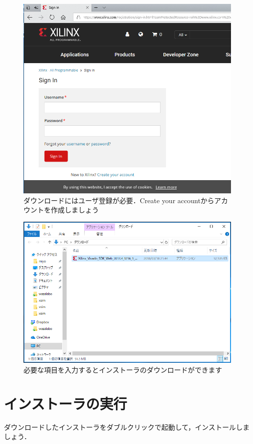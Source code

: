 \documentclass[a4paper,dvipdfmx]{jsarticle}
\begin{document}
 \begin{figure}[H]
  \begin{center}
   \includegraphics[width=.7\textwidth]{appendix_figures/04_xilinx_web_page.png}
  \end{center}
  \caption{ダウンロードにはユーザ登録が必要．Create your accountからアカウントを作成しましょう}
 \end{figure}

 \begin{figure}[H]
  \begin{center}
   \includegraphics[width=.65\textwidth]{appendix_figures/05_installer_downloaded.png}
  \end{center}
  \caption{必要な項目を入力するとインストーラのダウンロードができます}
 \end{figure}

 \section{インストーラの実行}
 ダウンロードしたインストーラをダブルクリックで起動して，インストールしましょう．
\end{document}
